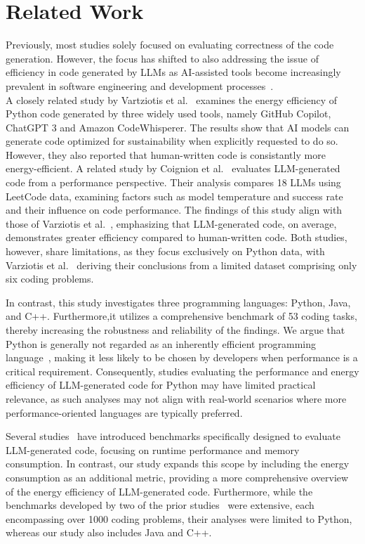 \section{Related Work}
\label{sec:relatedWork}
Previously, most studies solely focused on evaluating correctness of the code generation\cite{10403378, 10.1145/3627217.3627233, Chen2021EvaluatingLL}. However, the focus has shifted to also addressing the issue of efficiency in code generated by LLMs as AI-assisted tools become increasingly prevalent in software engineering and development processes~\cite{han-etal-2023-sample, Nitin_Sherje_2024, copilotAcc}.
\\
A closely related study by Vartziotis et al.~\cite{vartziotis2024learn} examines the energy efficiency of Python code generated by three widely used tools, namely GitHub Copilot, ChatGPT 3 and Amazon CodeWhisperer. The results show that AI models can generate code optimized for sustainability when explicitly requested to do so. However, they also reported that  human-written code is consistantly more energy-efficient.  A related study by Coignion et al.~\cite{10.1145/3661167.3661221} evaluates LLM-generated code from a performance perspective. Their analysis compares 18 LLMs using LeetCode data, examining factors such as model temperature and success rate and their influence on code performance. The findings of this study align with those of Varziotis et al.~\cite{vartziotis2024learn}, emphasizing that LLM-generated code, on average, demonstrates greater efficiency compared to human-written code. Both studies, however, share limitations, as they focus exclusively on Python data, with Varziotis et al.~\cite{vartziotis2024learn} deriving their conclusions from a limited dataset comprising only six coding problems.
\par In contrast, this study investigates three programming languages: Python, Java, and C++. Furthermore,it utilizes a comprehensive benchmark of 53 coding tasks, thereby increasing the robustness and reliability of the findings. We argue that Python is generally not regarded as an inherently efficient programming language~\cite{PEREIRA2021102609}, making it less likely to be chosen by developers when performance is a critical requirement. Consequently, studies evaluating the performance and energy efficiency of LLM-generated code for Python may have limited practical relevance, as such analyses may not align with real-world scenarios where more performance-oriented languages are typically preferred.
\par Several studies~\cite{du2024mercury, huang2024effibench, 10.1145/3597503.3623316, Hendrycks2021MeasuringCC, wang-etal-2023-recode, Huang2024EffiCodeUC} have introduced benchmarks specifically designed to evaluate LLM-generated code, focusing on runtime performance and memory consumption. In contrast, our study expands this scope by including the energy consumption as an additional metric, providing a more comprehensive overview of the energy efficiency of LLM-generated code. Furthermore, while the benchmarks developed by two of the prior studies~\cite{du2024mercury, huang2024effibench} were extensive, each encompassing over 1000 coding problems, their analyses were limited to Python, whereas our study also includes Java and C++. 
